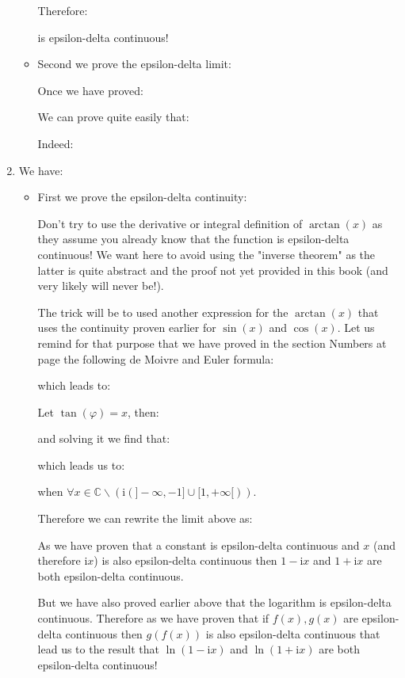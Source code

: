 \begin{enumerate}
\begin{itemize}
			Therefore: 
			
			is epsilon-delta continuous!
			
			\item Second we prove the epsilon-delta limit:
			
			Once we have proved:
			
			We can prove quite easily that:
			
			Indeed:
			
		\end{itemize}
		
		\item We have:
		
		
		\begin{itemize}
			\item First we prove the epsilon-delta continuity:
			
			Don't try to use the derivative or integral definition of $\arctan(x)$ as they assume you already know that the function is epsilon-delta continuous! We want here to avoid using the "inverse theorem" as the latter is quite abstract and the proof not yet provided in this book (and very likely will never be!).
			
			The trick will be to used another expression for the $\arctan(x)$ that uses the continuity proven earlier for $\sin(x)$ and $\cos(x)$. Let us remind for that purpose that we have proved in the section Numbers at page \pageref{de Moivre and Euler formulas} the following de Moivre and Euler formula:
			
			which leads to:
			
			Let $\tan (\varphi)=x$, then:
			
			and solving it we find that:
			
			which leads us to:
			
			when $\forall x \in \mathbb{C} \backslash(\mathrm{i}(]-\infty,-1] \cup[1,+\infty[))$.
			
			Therefore we can rewrite the limit above as:
			
			As we have proven that a constant is epsilon-delta continuous and $x$ (and therefore $\mathrm{i}x$) is also epsilon-delta continuous then $1-\mathrm{i}x$ and $1+\mathrm{i}x$ are both epsilon-delta continuous.
			
			But we have also proved earlier above that the logarithm is epsilon-delta continuous. Therefore as we have proven that if $f(x),g(x)$ are epsilon-delta continuous then $g(f(x))$ is also epsilon-delta continuous that lead us to the result that $\ln (1-\mathrm{i}x)$ and $\ln (1+\mathrm{i}x)$ are both epsilon-delta continuous!
			

\end{itemize}
\end{enumerate}
